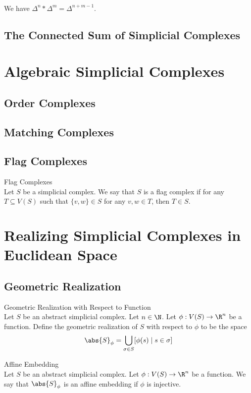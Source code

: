\documentclass[a4paper]{article}
\begin{document}
\begin{eg}{}{}\\
We have $\Delta^n\ast\Delta^m=\Delta^{n+m-1}$. 
\end{eg}

\subsection{The Connected Sum of Simplicial Complexes}

\pagebreak
\section{Algebraic Simplicial Complexes}
\subsection{Order Complexes}
\subsection{Matching Complexes}
\subsection{Flag Complexes}
\begin{defn}{Flag Complexes}{}\\
Let $S$ be a simplicial complex. We say that $S$ is a flag complex if for any $T\subseteq V(S)$ such that $\{v,w\}\in S$ for any $v,w\in T$, then $T\in S$. 
\end{defn}


\pagebreak
\section{Realizing Simplicial Complexes in Euclidean Space}
\subsection{Geometric Realization}
\begin{defn}{Geometric Realization with Respect to Function}{}\\
Let $S$ be an abstract simplicial complex. Let $n\in\N$. Let $\phi:V(S)\to\R^n$ be a function. Define the geometric realization of $S$ with respect to $\phi$ to be the space $$\abs{S}_\phi=\bigcup_{\sigma\in S}[\phi(s)\;|\;s\in\sigma]$$
\end{defn}

\begin{defn}{Affine Embedding}{}\\
Let $S$ be an abstract simplicial complex. Let $\phi:V(S)\to\R^n$ be a function. We say that $\abs{S}_\phi$ is an affine embedding if $\phi$ is injective. 
\end{defn}
\end{document}
